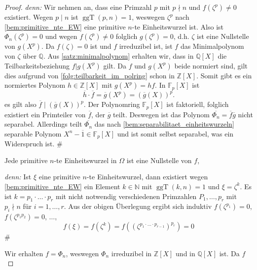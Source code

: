 \documentclass[a4paper, twoside, 11pt, ngerman]{report}
\newcommand{\FF}{\mathds F}
\newcommand{\NN}{\mathds N}
\newcommand{\QQ}{\mathds Q}
\newcommand{\ZZ}{\mathds Z}
\DeclareMathOperator{\ggT}{ggT}
\theoremstyle{definistyle}
\theoremstyle{remark}
\newenvironment{denn}%
  {\par\textit{denn:}}%
  {\hfill\#\par}
\begin{document}
\begin{proof}
\begin{denn}
Wir nehmen an, dass eine Primzahl $p$ mit $p \nmid n$ und $f(\zeta^p) \neq 0$ existiert.  
Wegen $p \mid n$ ist $\ggT(p, n) = 1$, weswegen $\zeta^p$ nach \ref{bem:primitive_nte_EW} eine primitive $n$-te Einheitswurzel ist. Also ist $\Phi_n(\zeta^p) = 0$ 
und wegen $f(\zeta^p)\neq 0$ folglich $g(\zeta^p)=0$, d.h. $\zeta$ ist eine Nullstelle
von $g(X^p)$. Da $f(\zeta)=0$ ist und $f$ irreduzibel ist, ist $f$ das Minimalpolynom von $\zeta$ über $\QQ$. Aus \ref{satz:minimalpolynom} erhalten wir, dass in $\QQ[X]$
die Teilbarkeitsbeziehung $f|g(X^p)$ gilt. Da $f$ und $g(X^p)$ beide normiert sind, gilt dies aufgrund von \ref{folg:teilbarkeit_im_polring} schon in $\ZZ[X]$. Somit gibt es
ein normiertes Polynom $h\in\ZZ[X]$ mit $g(X^p)=hf$. In $\FF_p[X]$ ist
\[
\overline{h}\cdot\overline{f}=\overline{g}(X^p)=(\overline{g}(X))^p.
\]
es gilt also $\overline{f}\mid(\overline{g}(X))^p$. Der Polynomring $\FF_p[X]$ ist faktoriell, folglich existiert ein Primteiler von $\overline{f}$, der $\overline{g}$ teilt.
Deswegen ist das Polynom $\overline{\Phi_n}=\overline{f}\overline{g}$ nicht separabel.
Allerdings teilt $\overline{\Phi_n}$ das nach \ref{bem:separabilitaet_einheitswurzeln} separable Polynom $X^n-\overline{1}\in\FF_p[X]$ und ist somit selbst separabel, was ein
Widerspruch ist.
\end{denn}
Jede primitive $n$-te Einheitswurzel in $\Omega$ ist eine Nullstelle von $f$, 
\begin{denn}
Ist $\xi$ eine primitive $n$-te Einheitswurzel, dann existiert wegen
\ref{bem:primitive_nte_EW} ein Element $k\in\NN$ mit $\ggT(k,n)=1$ und
$\xi=\zeta^k$. Es ist $k=p_1\cdot\ldots\cdot p_r$ mit nicht notwendig verschiedenen Primzahlen $P_1,\ldots,p_r$ mit $p_i\nmid n$ für $i=1,\ldots,r$. Aus der obigen Überlegung
ergibt sich induktiv $f(\zeta^{p_1})=0$, $f(\zeta^{p_1p_2})=0$, $\ldots$, 
\[
f(\xi)=f(\zeta^k)=f((\zeta^{p_1\cdot\ldots\cdot p_{r-1}})^{p_r})=0
\]
\end{denn}
Wir erhalten $f=\Phi_n$, weswegen $\Phi_n$ irreduzibel in $\ZZ[X]$ und in $\QQ[X]$ ist. Da
$f$ 
\end{proof}
\end{document}
